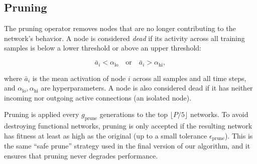 \subsection{Pruning}

The pruning operator removes nodes that are no longer contributing to
the network's behavior. A node is considered \emph{dead} if its
activity across all training samples is below a lower threshold or
above an upper threshold:

\begin{equation}
  \bar{a}_i < \alpha_{\text{lo}} \quad \text{or} \quad
  \bar{a}_i > \alpha_{\text{hi}},
  \label{eq:dead-node}
\end{equation}

where $\bar{a}_i$ is the mean activation of node $i$ across all
samples and all time steps, and $\alpha_{\text{lo}}, \alpha_{\text{hi}}$
are hyperparameters. A node is also considered dead if it has neither
incoming nor outgoing active connections (an isolated node).

Pruning is applied every $g_{\text{prune}}$ generations to the top
$\lfloor P/5 \rfloor$ networks. To avoid destroying functional
networks, pruning is only accepted if the resulting network has
fitness at least as high as the original (up to a small tolerance
$\epsilon_{\text{prune}}$). This is the same ``safe prune'' strategy
used in the final version of our algorithm, and it ensures that
pruning never degrades performance.

